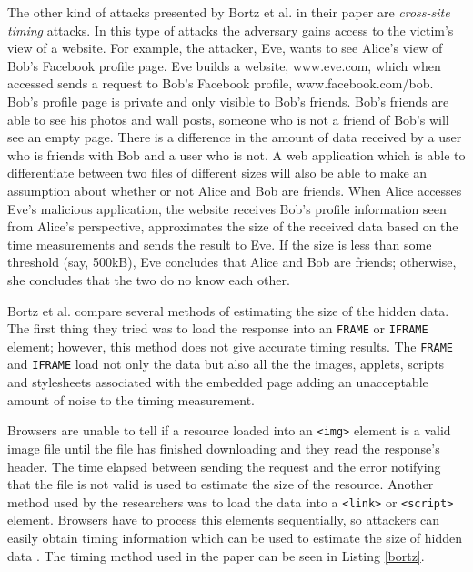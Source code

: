 \documentclass[10pt,a4paper,twoside]{book}
\begin{document}
The other kind of attacks presented by Bortz et al. \cite{bortz2007exposing} in their paper are \textit{cross-site timing} attacks. In this type of attacks the adversary gains access to the victim's view of a website. For example, the attacker, Eve, wants to see Alice's view of Bob's Facebook profile page. Eve builds a website, www.eve.com, which when accessed sends a request to Bob's Facebook profile, www.facebook.com/bob. Bob's profile page is private and only visible to Bob's friends. Bob's friends are able to see his photos and wall posts, someone who is not a friend of Bob's will see an empty page. There is a difference in the amount of data received by a user who is friends with Bob and a user who is not. A web application which is able to differentiate between two files of different sizes will also be able to make an assumption about whether or not Alice and Bob are friends. When Alice accesses Eve's malicious application, the website receives Bob's profile information seen from Alice's perspective, approximates the size of the received data based on the time measurements and sends the result to Eve. If the size is less than some threshold (say, 500kB), Eve concludes that Alice and Bob are friends; otherwise, she concludes that the two do no know each other.

Bortz et al. \cite{bortz2007exposing} compare several methods of estimating the size of the hidden data. The first thing they tried was to load the response into an \texttt{FRAME} or \texttt{IFRAME} element; however, this method does not give accurate timing results. The \texttt{FRAME} and \texttt{IFRAME} load not only the data but also  all the the images, applets, scripts and stylesheets associated with the embedded page adding an unacceptable amount of noise to the timing measurement.

Browsers are unable to tell if a resource loaded into an \texttt{<img>} element is a valid image file until the file has finished downloading and they read the response's header. The time elapsed between sending the request and the error notifying that the file is not valid is used to estimate the size of the resource. Another method used by the researchers was to load the data into a \texttt{<link>} or \texttt{<script>} element. Browsers have to process this elements sequentially, so attackers can easily obtain timing information which can be used to estimate the size of hidden data \cite{bortz2007exposing}. The timing method used in the paper can be seen in Listing \ref{bortz}.
\end{document}
